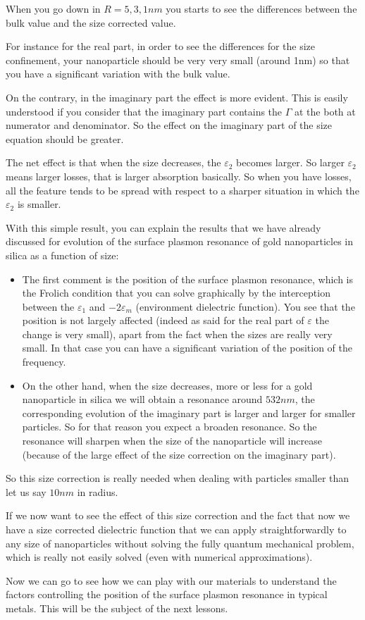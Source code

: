 \documentclass[../main/main.tex]{subfiles}
\begin{document}
When you go down in \( R=5,3,1nm \) you starts to see the differences between the bulk value and the size corrected value.

For instance for the real part, in order to see the differences for the size confinement, your nanoparticle should be very very small (around 1nm) so that you have a significant variation with the bulk value.

On the contrary, in the imaginary part the effect is more evident. This is easily understood if you consider that the imaginary part contains the \( \Gamma  \) at the both at numerator and denominator. So the effect on the imaginary part of the size equation should be greater.

The net effect is that when the size decreases, the  \( \varepsilon_2  \) becomes larger. So larger \( \varepsilon _2 \) means larger losses, that is larger absorption basically. So when you have losses, all the feature tends to be spread with respect to a sharper situation in which the \( \varepsilon _2 \) is smaller.

With this simple result, you can explain the results that we have already discussed for evolution of the surface plasmon resonance of gold nanoparticles in silica as a function of size:
\begin{itemize}
\item The first comment is the position of the surface plasmon resonance, which is the Frolich condition that you can solve graphically by the interception between the \( \varepsilon _1 \) and \( -2 \varepsilon _m \) (environment dielectric function). You see that the position is not largely affected (indeed as said for the real part of \( \varepsilon  \) the change is very small), apart from the fact when the sizes are really very small. In that case you can have a significant variation of the position of the frequency.

\item On the other hand, when the size decreases, more or less for a gold nanoparticle in silica we will obtain a resonance around \( 532nm \), the corresponding evolution of the imaginary part is larger and larger for smaller particles. So for that reason you expect a broaden resonance.
So the resonance will sharpen when the size of the nanoparticle will increase (because of the large effect of the size correction on the imaginary part).

\end{itemize}

So this size correction is really needed when dealing with particles smaller than let us say \( 10nm \) in radius.

If we now want to see the effect of this size correction and the fact that now we have a size corrected dielectric function that we can apply straightforwardly to any size of nanoparticles without solving  the fully quantum mechanical problem, which is really not easily solved (even with numerical approximations).


Now we can go to see how we can play with our materials to understand the factors controlling the position of the surface plasmon resonance in typical metals. This will be the subject of the next lessons.




\clearpage
\end{document}
